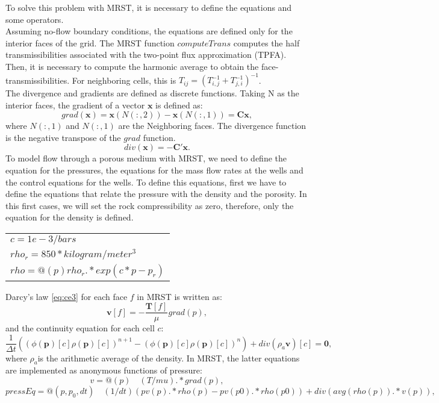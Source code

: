 \documentclass[12pt]{report}
\begin{document}
\newpage
To solve this problem with MRST, it is necessary to define the equations and some operators. \\
Assuming no-flow boundary conditions, the equations are defined only for the interior faces of the grid.
The MRST function $computeTrans$ computes the half transmissibilities associated 
with the two-point flux approximation (TPFA). Then, it is necessary to compute the harmonic average to 
obtain the face-transmissibilities. 
For neighboring cells, this is $T_{ij}=(T_{i,j}^{-1}+T_{j,i}^{-1})^{-1}$.\\
The divergence and gradients are defined as discrete functions. Taking N as the interior faces, 
the gradient of a vector $\mathbf{x}$ is defined as:
$$grad(\mathbf{x})=\mathbf{x}(N(:,2))-\mathbf{x}(N(:,1))=\mathbf{C}\mathbf{x},$$
where $N(:,1)$ and $N(:,1)$ are the Neighboring faces. The divergence function is the negative 
transpose of the $grad$ function.
$$div(\mathbf{x})=-\mathbf{C'}\mathbf{x}.$$
To model flow through a porous medium with MRST, we need to define the equation for the pressures, 
the equations for the mass flow rates at the wells and the
control equations for the wells. To define this equations, first we have to define the equations
that relate the pressure with the density and the porosity. In this first cases, we will set
the rock compressibility as zero, therefore, only the equation for the density is defined.
\begin{table}[H]
\centering
{\tabulinesep=1.11mm \begin{tabu}{ |l |} 
\hline
$c=1e-3/bars$\\
$rho_r= 850*kilogram/meter ^  3$\\
$rho=@(p) rho_r.*exp(c*p-p_r)$\\
 \hline
\end{tabu}}
\label{table:rh}
\end{table} 
Darcy's law \eqref{eq:ce3} for each face $f$ in MRST is written as:
$$\mathbf{v}[f]=-\frac{\mathbf{T}[f]}{\mu}grad(p),$$
and the continuity equation for each cell $c$:
$$\frac{1}{\Delta t}\left((\phi(\mathbf{p})[c]\rho(\mathbf{p})[c])^{n+1}-(\phi(\mathbf{p})[c]\rho(\mathbf{p})[c])^{n}\right)
+div(\rho_a\mathbf{v})[c]=\mathbf{0},$$
where $\rho_a$is the arithmetic average of the density.
In MRST, the latter equations are implemented as anonymous functions of pressure:
$$v= @(p)\quad (T/mu).*grad(p),$$
\begin{equation}\label{eq:pressEq}
pressEq= @(p,p_0,dt) \quad(1/dt)(pv(p).*rho(p)-pv(p0).*rho(p0))+div(avg(rho(p)).*v(p)),
\end{equation}
\end{document}
